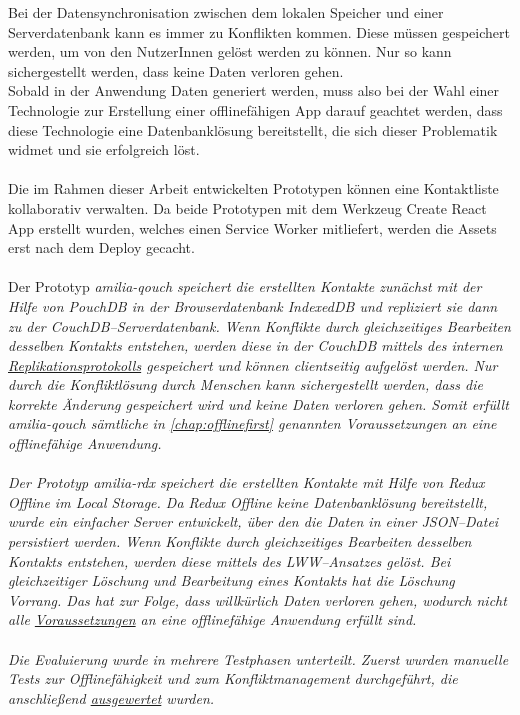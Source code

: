 Bei der Datensynchronisation zwischen dem lokalen Speicher und einer Serverdatenbank kann es immer zu Konflikten kommen.
Diese müssen gespeichert werden, um von den NutzerInnen gelöst werden zu können. Nur so kann sichergestellt werden, dass keine Daten verloren gehen.\\
Sobald in der Anwendung Daten generiert werden, muss also bei der Wahl einer Technologie zur Erstellung einer offlinefähigen \gls{App} darauf geachtet werden, dass diese Technologie eine Datenbanklösung bereitstellt, die sich dieser Problematik widmet und sie erfolgreich löst.\\\\
%
%
%
Die im Rahmen dieser Arbeit entwickelten Prototypen können eine Kontaktliste kollaborativ verwalten.
Da beide Prototypen mit dem Werkzeug Create React App erstellt wurden, welches einen Service Worker mitliefert, werden die \gls{Assets} erst nach dem Deploy gecacht.\\\\
Der Prototyp \it{amilia-qouch} speichert die erstellten Kontakte zunächst mit der Hilfe von PouchDB in der Browserdatenbank IndexedDB und repliziert sie dann zu der CouchDB--Serverdatenbank.
Wenn Konflikte durch gleichzeitiges Bearbeiten desselben Kontakts entstehen, werden diese in der CouchDB mittels des internen \hyperref[chap:replication]{Replikationsprotokolls} gespeichert und können clientseitig aufgelöst werden.
Nur durch die Konfliktlösung durch Menschen kann sichergestellt werden, dass die korrekte Änderung gespeichert wird und keine Daten verloren gehen.
Somit erfüllt \it{amilia-qouch} sämtliche in \autoref{chap:offlinefirst} genannten Voraussetzungen an eine offlinefähige Anwendung.\\\\
%
Der Prototyp \it{amilia-rdx} speichert die erstellten Kontakte mit Hilfe von Redux Offline im Local Storage.
Da Redux Offline keine Datenbanklösung bereitstellt, wurde ein einfacher Server entwickelt, über den die Daten in einer \gls{JSON}--Datei persistiert werden.
Wenn Konflikte durch gleichzeitiges Bearbeiten desselben Kontakts entstehen, werden diese mittels des \gls{LWW}--Ansatzes gelöst.
Bei gleichzeitiger Löschung und Bearbeitung eines Kontakts hat die Löschung Vorrang.
Das hat zur Folge, dass willkürlich Daten verloren gehen, wodurch nicht alle \hyperref[chap:offlinefirst]{Voraussetzungen} an eine offlinefähige Anwendung erfüllt sind.\\\\
%
%
Die Evaluierung wurde in mehrere Testphasen unterteilt. Zuerst wurden manuelle Tests zur Offlinefähigkeit und zum Konfliktmanagement durchgeführt, die anschließend \hyperref[chap:testauswertung]{ausgewertet} wurden.
